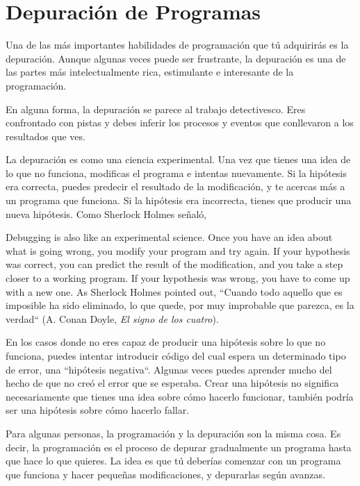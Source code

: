 \section{Depuración de Programas}

Una de las más importantes habilidades de programación 
que tú adquirirás es la depuración. Aunque algunas veces 
puede ser frustrante, la depuración es una de las partes más
intelectualmente rica, estimulante e interesante de la
programación.  

En alguna forma, la depuración se parece al trabajo detectivesco.
Eres confrontado con pistas y debes inferir los procesos y eventos
que conllevaron a los resultados que ves.

La depuración es como una ciencia experimental. Una vez que tienes
una idea de lo que no funciona, modificas el programa e intentas 
nuevamente. Si la hipótesis era correcta, puedes predecir el resultado
de la modificación, y te acercas más a un programa que funciona. Si la
hipótesis era incorrecta, tienes que producir una nueva hipótesis. 
Como Sherlock Holmes señaló, 


Debugging is also like an experimental science.  Once you have an idea
about what is going wrong, you modify your program and try again.  If
your hypothesis was correct, you can predict the result of the
modification, and you take a step closer to a working program.  If
your hypothesis was wrong, you have to come up with a new one.  As
Sherlock Holmes pointed out, ``Cuando todo aquello que es imposible 
ha sido eliminado, lo que quede, por muy improbable que parezca, 
es la verdad``
(A. Conan Doyle, {\em El signo de los cuatro}).

En los casos donde no eres capaz de producir una hipótesis
sobre lo que no funciona, puedes intentar introducir
código del cual espera un determinado tipo de error, 
una ``hipótesis negativa``. Algunas veces puedes aprender 
mucho del hecho de que no creó el error que se esperaba. 
Crear una hipótesis no significa necesariamente que tienes 
una idea sobre cómo hacerlo funcionar, también podría ser
una hipótesis sobre cómo hacerlo fallar.

Para algunas personas, la programación y la depuración son
la misma cosa. Es decir, la programación es el proceso de 
depurar gradualmente un programa hasta que hace lo que quieres.
La idea es que tú deberías comenzar con un programa que funciona y 
hacer pequeñas modificaciones, y depurarlas según avanzas.

